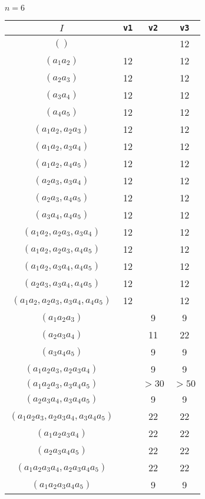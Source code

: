 \documentclass{article}
\begin{document}
\begin{flushleft}
\begin{center}
      $n=6$
      \begin{longtable}{|c|c|c|c|}
         \hline
         $I$ & \texttt{v1} & \texttt{v2} & \texttt{v3} \\
         \hline 
         $()$ & && 12 \\
         \hhline{|=|=|=|=|} 
         $(a_1a_2)$ & 12 && 12 \\
         $(a_2a_3)$ & 12 && 12 \\
         $(a_3a_4)$ & 12 && 12 \\
         $(a_4a_5)$ & 12 && 12 \\
         $(a_1a_2, a_2a_3)$ & 12 && 12 \\
         $(a_1a_2, a_3a_4)$ & 12 && 12 \\
         $(a_1a_2, a_4a_5)$ & 12 && 12 \\
         $(a_2a_3, a_3a_4)$ & 12 && 12 \\
         $(a_2a_3, a_4a_5)$ & 12 && 12 \\
         $(a_3a_4, a_4a_5)$ & 12 && 12 \\
         $(a_1a_2, a_2a_3, a_3a_4)$ & 12 && 12 \\
         $(a_1a_2, a_2a_3, a_4a_5)$ & 12 && 12 \\
         $(a_1a_2, a_3a_4, a_4a_5)$ & 12 && 12 \\
         $(a_2a_3, a_3a_4, a_4a_5)$ & 12 && 12 \\
         $(a_1a_2, a_2a_3, a_3a_4, a_4a_5)$ & 12 && 12 \\
         \hhline{|=|=|=|=|} 
         $(a_1a_2a_3)$ && 9 & 9 \\
         $(a_2a_3a_4)$ && 11 & 22\\
         $(a_3a_4a_5)$ && 9 & 9\\
         $(a_1a_2a_3, a_2a_3a_4)$ && 9 & 9 \\
         \rowcolor{red!50!white}
         $(a_1a_2a_3, a_3a_4a_5)$ && $>30$ & $>50$ \\
         $(a_2a_3a_4, a_3a_4a_5)$ && 9 & 9\\
         $(a_1a_2a_3, a_2a_3a_4, a_3a_4a_5)$ && 22 & 22 \\
         \hhline{|=|=|=|=|} 
         $(a_1a_2a_3a_4)$ && 22 & 22\\
         $(a_2a_3a_4a_5)$ && 22 & 22\\
         $(a_1a_2a_3a_4, a_2a_3a_4a_5)$ && 22 & 22\\
         \hhline{|=|=|=|=|} 
         $(a_1a_2a_3a_4a_5)$ && 9 & 9 \\
         \hline
      \end{longtable}
      

\end{center}
\end{flushleft}
\end{document}
